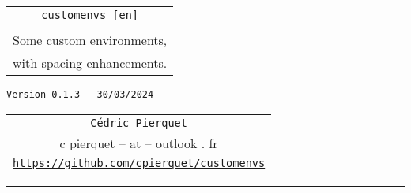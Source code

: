 \documentclass[english,11pt,a4paper]{article}
\def\TPversion{0.1.3}
\def\TPdate{30/03/2024}
\begin{document}
\pagestyle{fancy}

\thispagestyle{empty}

\begin{center}
	\begin{minipage}{0.75\linewidth}
	\begin{tcolorbox}[colframe=yellow,colback=yellow!15]
		\begin{center}
			\renewcommand\arraystretch{1.25}
			\begin{tabular}{c}
				{\Huge \texttt{customenvs [en]}}\\
				\\
				{\Large Some custom environments,} \\
				{\Large with spacing enhancements.} \\
			\end{tabular}
			\renewcommand\arraystretch{1}
			
			\medskip
			
			{\small \texttt{Version \TPversion{} -- \TPdate}}
		\end{center}
	\end{tcolorbox}
\end{minipage}
\end{center}

\vspace*{1mm}

\begin{center}
	\begin{tabular}{c}
	\texttt{Cédric Pierquet}\\
	{\ttfamily c pierquet -- at -- outlook . fr}\\
	\texttt{\url{https://github.com/cpierquet/customenvs}}
\end{tabular}
\end{center}

\vspace*{5mm}

%
%
%
%
%

\hrule


\hypertarget{matoc}{}

\tableofcontents

\vspace*{5mm}
\end{document}
